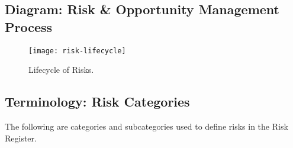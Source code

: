 \subsection{Diagram: Risk \& Opportunity Management Process}

\begin{figure}[H]
\caption{Lifecycle of Risks.}
\centering
\texttt{[image: risk-lifecycle]}
\label{fig:risk-lifecycle}
\end{figure}

\subsection{Terminology: Risk Categories}
\label{sec:risk-categories}

The following are categories and subcategories used to define risks in the Risk Register.

